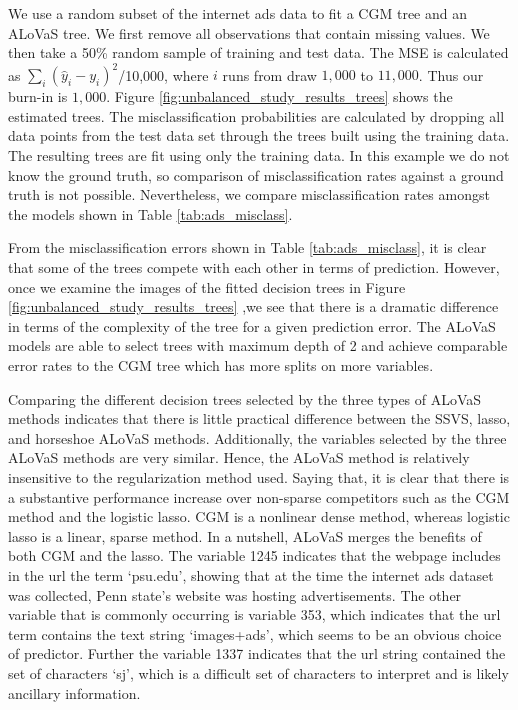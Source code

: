 		We use a random subset of the internet ads data to fit a CGM tree and an ALoVaS tree. We first remove all observations that contain missing values. We then take a 50\% random sample of training and test data. The MSE is calculated as $\sum_{i}(\hat{y}_{i}-y_i)^{2}$/10,000, where $i$ runs from draw $1,000$ to $11,000$. Thus our burn-in is $1,000$. Figure \ref{fig:unbalanced_study_results_trees} shows the estimated trees. The misclassification probabilities are calculated by dropping all data points from the test data set through the trees built using the training data. The resulting trees are fit using only the training data.  In this example we do not know the ground truth, so comparison of misclassification rates against a ground truth is not possible. Nevertheless, we compare misclassification rates amongst the models shown in Table \ref{tab:ads_misclass}. 
		
		From the misclassification errors shown in Table \ref{tab:ads_misclass}, it is clear that some of the trees compete with each other in terms of prediction. However, once we examine the images of the fitted decision trees in Figure \ref{fig:unbalanced_study_results_trees} ,we see that there is a dramatic difference in terms of the complexity of the tree for a given prediction error. The ALoVaS models are able to select trees with maximum depth of 2 and achieve comparable error rates to the CGM tree which has more splits on more variables. 
		
		Comparing the different decision trees selected by the three types of ALoVaS methods indicates that there is little practical difference between the SSVS, lasso, and horseshoe ALoVaS methods. Additionally, the variables selected by the three ALoVaS methods are very similar. Hence, the ALoVaS method is relatively insensitive to the regularization method used. Saying that, it is clear that there is a substantive performance increase over non-sparse competitors such as the CGM method and the logistic lasso. CGM is a nonlinear dense method, whereas logistic lasso is a linear, sparse method. In a nutshell, ALoVaS merges the benefits of both CGM and the lasso. The variable 1245 indicates that the webpage includes in the url the term `psu.edu', showing that at the time the internet ads dataset was collected, Penn state's website was hosting advertisements. The other variable that is commonly occurring is variable 353, which indicates that the url term contains the text string `images+ads', which seems to be an obvious choice of predictor. Further the variable 1337 indicates that the url string contained the set of characters `sj', which is a difficult set of characters to interpret and is likely ancillary information. 
		
